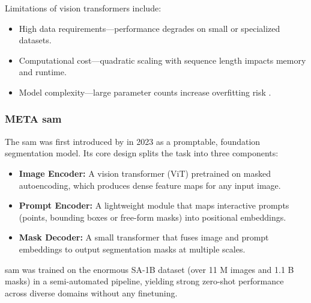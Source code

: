 Limitations of vision transformers include:
\begin{itemize}

    \item High data requirements—performance degrades on small or specialized datasets.  
    \item Computational cost—quadratic scaling with sequence length impacts memory and runtime.  
    \item Model complexity—large parameter counts increase overfitting risk \cite{lee_enhancing_mamba_s6_2024}.
\end{itemize}


\subsubsection{META \acrlong{sam}}
\label{ssec:meta_sam2}
The \acrfull{sam} was first introduced by \textcite{kirillov_segment_2023} in 2023 as a promptable, foundation segmentation model.  Its core design splits the task into three components:
\begin{itemize}
    \item \textbf{Image Encoder:} A vision transformer (ViT) pretrained on masked autoencoding, which produces dense feature maps for any input image.
    \item \textbf{Prompt Encoder:} A lightweight module that maps interactive prompts (points, bounding boxes or free-form masks) into positional embeddings.
    \item \textbf{Mask Decoder:} A small transformer that fuses image and prompt embeddings to output segmentation masks at multiple scales.
\end{itemize}
\acrshort{sam} was trained on the enormous SA-1B dataset (over 11 M images and 1.1 B masks) in a semi-automated pipeline, yielding strong zero-shot performance across diverse domains without any finetuning.

